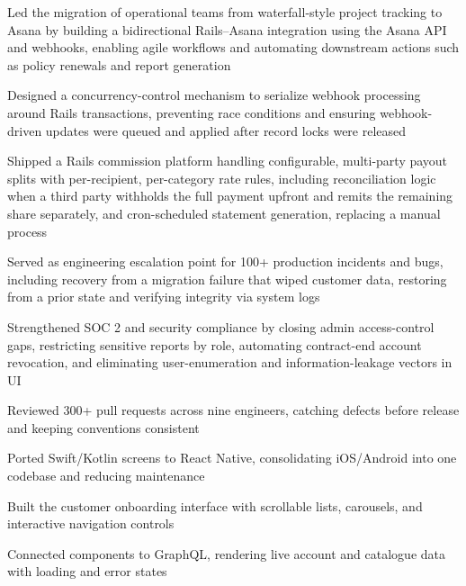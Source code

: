 \begin{points}
  \item Led the migration of operational teams from waterfall-style project tracking to Asana by building a bidirectional Rails–Asana integration using the Asana API and webhooks, enabling agile workflows and automating downstream actions such as policy renewals and report generation
  \item Designed a concurrency-control mechanism to serialize webhook processing around Rails transactions, preventing race conditions and ensuring webhook-driven updates were queued and applied after record locks were released
  \item Shipped a Rails commission platform handling configurable, multi-party payout splits with per-recipient, per-category rate rules, including reconciliation logic when a third party withholds the full payment upfront and remits the remaining share separately, and cron-scheduled statement generation, replacing a manual process
  \item Served as engineering escalation point for 100+ production incidents and bugs, including recovery from a migration failure that wiped customer data, restoring from a prior state and verifying integrity via system logs
  \item Strengthened SOC 2 and security compliance by closing admin access-control gaps, restricting sensitive reports by role, automating contract-end account revocation, and eliminating user-enumeration and information-leakage vectors in UI
  \item Reviewed 300+ pull requests across nine engineers, catching defects before release and keeping conventions consistent
\end{points}

\vspace{\betweenentry}
\begin{points}
  \item Ported Swift/Kotlin screens to React Native, consolidating iOS/Android into one codebase and reducing maintenance
  \item Built the customer onboarding interface with scrollable lists, carousels, and interactive navigation controls
  \item Connected components to GraphQL, rendering live account and catalogue data with loading and error states
\end{points}

